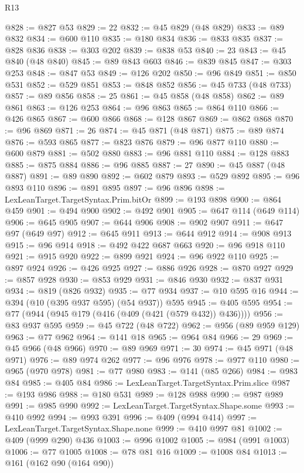 \begin{lexlean}{R13}
\begin{coremodule}
{{{{{{{{{{{{{{{{{{{{{{{{{{{{{{{{{{{{{{{{{{{{{{{{{{{{{{{{{{{{{{{{{{{{{{{{{{{{{{{{{{{{{{{{{{{{{{{{{{{{{{{{{{@828 := @827 @53
@829 := 22
@832 := @45 @829 (@48 @829)
@833 := @89 @832
@834 := @600 @110
@835 := @180 @834
@836 := @833 @835
@837 := @828 @836
@838 := @303 @202
@839 := @838 @53
@840 := 23
@843 := @45 @840 (@48 @840)
@845 := @89 @843 @603
@846 := @839 @845
@847 := @303 @253
@848 := @847 @53
@849 := @126 @202
@850 := @96 @849
@851 := @850 @531
@852 := @529 @851
@853 := @848 @852
@856 := @45 @733 (@48 @733)
@857 := @89 @856
@858 := 25
@861 := @45 @858 (@48 @858)
@862 := @89 @861
@863 := @126 @253
@864 := @96 @863
@865 := @864 @110
@866 := @426 @865
@867 := @600 @866
@868 := @128 @867
@869 := @862 @868
@870 := @96 @869
@871 := 26
@874 := @45 @871 (@48 @871)
@875 := @89 @874
@876 := @593 @865
@877 := @823 @876
@879 := @96 @877 @110
@880 := @600 @879
@881 := @502 @880
@883 := @96 @881 @110
@884 := @128 @883
@885 := @875 @884
@886 := @96 @885
@887 := 27
@890 := @45 @887 (@48 @887)
@891 := @89 @890
@892 := @602 @879
@893 := @529 @892
@895 := @96 @893 @110
@896 := @891 @895
@897 := @96 @896
@898 := LexLeanTarget.TargetSyntax.Prim.bitOr
@899 := @193 @898
@900 := @864 @459
@901 := @494 @900
@902 := @492 @901
@905 := @647 @114 (@649 @114)
@906 := @645 @905
@907 := @644 @906
@908 := @902 @907
@911 := @647 @97 (@649 @97)
@912 := @645 @911
@913 := @644 @912
@914 := @908 @913
@915 := @96 @914
@918 := @492 @422 @687 @663
@920 := @96 @918 @110
@921 := @915 @920
@922 := @899 @921
@924 := @96 @922 @110
@925 := @897 @924
@926 := @426 @925
@927 := @886 @926
@928 := @870 @927
@929 := @857 @928
@930 := @853 @929
@931 := @846 @930
@932 := @837 @931
@934 := @819 (@826 @932)
@935 := @77 @934
@937 := @10 @595 @16
@944 := @394 (@10 (@395 @937 @595) (@54 @937)) @595
@945 := @405 @595
@954 := @77 (@944 (@945 @179 (@416 (@409 (@421 (@579 @432)) @436))))
@956 := @83 @937 @595
@959 := @45 @722 (@48 @722)
@962 := @956 (@89 @959 @129)
@963 := @77 @962
@964 := @141 @18
@965 := @964 @84
@966 := 29
@969 := @45 @966 (@48 @966)
@970 := @89 @969
@971 := 30
@974 := @45 @971 (@48 @971)
@976 := @89 @974 @262
@977 := @96 @976
@978 := @977 @110
@980 := @965 (@970 @978)
@981 := @77 @980
@983 := @141 (@85 @266)
@984 := @983 @84
@985 := @405 @84
@986 := LexLeanTarget.TargetSyntax.Prim.slice
@987 := @193 @986
@988 := @180 @531
@989 := @128 @988
@990 := @987 @989
@991 := @985 @990
@992 := LexLeanTarget.TargetSyntax.Shape.some
@993 := @410 @992
@994 := @993 @391
@996 := @409 (@994 @414)
@997 := LexLeanTarget.TargetSyntax.Shape.none
@999 := @410 @997 @81
@1002 := @409 (@999 @290) @436
@1003 := @996 @1002
@1005 := @984 (@991 @1003)
@1006 := @77 @1005
@1008 := @78 @81 @16
@1009 := @1008 @84
@1013 := @161 (@162 @90 (@164 @90))
}}}}}}}}}}}}}}}}}}}}}}}}}}}}}}}}}}}}}}}}}}}}}}}}}}}}}}}}}}}}}}}}}}}}}}}}}}}}}}}}}}}}}}}}}}}}}}}}}}}}}}}}}}
\end{coremodule}
\end{lexlean}
